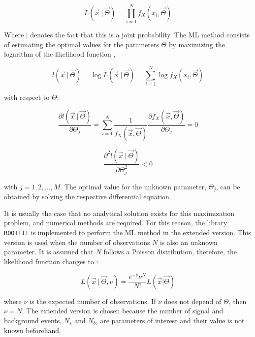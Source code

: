 \begin{equation}
L(\vec{x} \ | \ \vec{\Theta}) = \prod_{i = 1}^{N} f_X(x_i, \vec{\Theta}) 
\end{equation}

Where $|$ denotes the fact that this is a joint probability. The ML method consists of estimating the optimal values for the parameters $\Theta$ by maximizing the logarithm of the likelihood function \cite{mejia2012medida},

\begin{equation}
	l(\vec{x} \ | \ \vec{\Theta}) = \log L(\vec{x} \ | \ \vec{\Theta}) = \sum_{i = 1}^{N} \log f_X(x_i, \vec{\Theta})
\end{equation} 

with respect to $\Theta$:

\begin{equation}
	\frac{\partial{l(\vec{x} \ | \ \vec{\Theta})}}{\partial \Theta_j} = \sum_{i = 1}^{N} \frac{1}{f_X(\vec{x}, \vec{\Theta})} \frac{\partial{f_X(\vec{x}, \vec{\Theta})}}{\partial \Theta_j} = 0
\end{equation} 

\begin{equation}
	\frac{\partial^2{l(\vec{x} \ | \ \vec{\Theta})}}{\partial \Theta_j ^2} < 0
	\label{eq:ml}
\end{equation}

with $ j = 1, 2, ..., M$. The optimal value for the unknown parameter, $\Theta_j$, can be obtained by solving the respective differential equation.

It is usually the case that no analytical solution exists for this maximization problem, and numerical methods are required. For this reason, the library \verb|ROOTFIT| is implemented to perform the ML method in the extended version. This version is used when the number of observations $N$ is also an unknown parameter. It is assumed that $N$ follows a Poisson distribution, therefore, the likelihood function changes to \cite{bonanomi2021response}:

\begin{equation}
	L(\vec{x} \ | \ \vec{\Theta}, \nu) = \frac{e^{-\nu} \nu^N}{N!} L(\vec{x} | \vec{\Theta})
\end{equation}

where $\nu$ is the expected number of observations. 
If $\nu$ does not depend of $\Theta$, then $\nu = N$. The extended version is chosen because the number of signal and background events, $N_s$ and $N_b$, are parameters of interest and their value is not known beforehand. 
